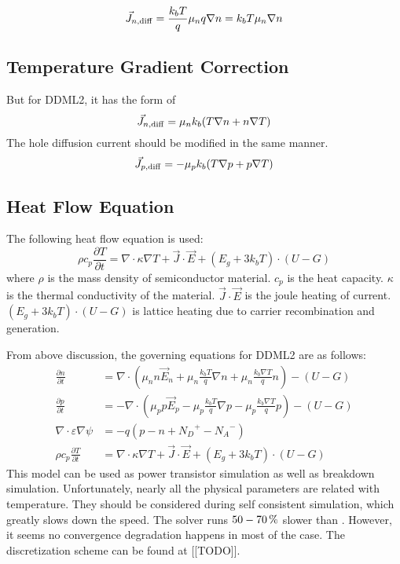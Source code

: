 \documentclass[oneside,12pt]{cgd_book}
\begin{document}
\begin{equation}
{\vec{J}}_{n,{\rm diff}} = \frac{k_b T}{q}\mu_n q\nabla n = k_b T\mu_n \nabla n
\end{equation}
\subsection{Temperature Gradient Correction}But for DDML2, it has the form of
\begin{equation}
{\vec{J}}_{n,{\rm diff}} = \mu_n k_b (T\nabla n + n\nabla T)
\end{equation}
The hole diffusion current should be modified in the same manner.
\begin{equation}
{\vec{J}}_{p,{\rm diff}} = -\mu_p k_b (T\nabla p + p\nabla T)
\end{equation}
\subsection{Heat Flow Equation}\label{Heat flow equation+DDML2}The following heat flow equation is used:
\begin{equation}
\rho c_p \frac{\partial T}{\partial t} = \nabla \cdot \kappa \nabla T + \vec{J} \cdot \vec{E} + (E_g + 3k_b T) \cdot
        (U - G)
\end{equation}
where $\rho$ is the mass density of semiconductor material. $c_p$
is the heat capacity. $\kappa$ is the thermal conductivity
      of the material. $\vec{J}\cdot\vec{E}$ is the joule heating of current.
$(E_g + 3k_b T) \cdot (U - G)$ is lattice heating due to carrier recombination and
      generation.
\par
From above discussion, the governing equations for DDML2 are as follows:
\begin{subequations}
\begin{align}
 \frac{\partial n}{\partial t}  &= \nabla \cdot \left(\mu_n n \vec{E}_n + \mu_n \frac{k_b T}{q}\nabla n + \mu_n
        \frac{k_b \nabla T}{q} n\right) - \left( {U - G} \right)\\
 \frac{\partial p}{\partial t}  &= -\nabla \cdot \left(\mu_p p \vec{E}_p - \mu_p \frac{k_b T}{q}\nabla p -
        \mu_p \frac{k_b \nabla T}{q} p\right) - \left( {U - G} \right)\\
 \nabla \cdot \varepsilon \nabla \psi  &= - q\left( {p - n + {N_D}^+ - {N_A}^ - } \right)\\
 \rho c_p \frac{\partial T}{\partial t}  &= \nabla \cdot \kappa \nabla T + \vec{J} \cdot \vec{E} + (E_g + 3k_b
        T) \cdot (U - G)
\end{align}
\end{subequations}
This model can be used as power transistor simulation as well as breakdown simulation. Unfortunately, nearly
      all the physical parameters are related with temperature. They should be considered during self consistent
      simulation, which greatly slows down the speed. The 
solver runs $50-70\text{\,\%}$ slower than . However, it seems no convergence
      degradation happens in most of the case. The discretization scheme can be found at [[TODO]].
\par
\end{document}
